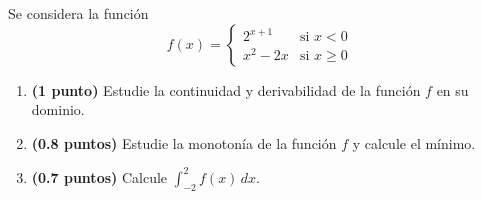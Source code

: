 
Se considera la función
\[
f(x)=\begin{cases}
2^{x+1} & \text{si }x<0\\
x^2-2x & \text{si }x\geq 0
\end{cases}
\]
\begin{enumerate}[label=\alph*)]
  \item \textbf{(1 punto)} Estudie la continuidad y derivabilidad de la
  función $f$ en su dominio.
  \item \textbf{(0.8 puntos)} Estudie la monotonía de la función $f$ y
  calcule el mínimo.
  \item \textbf{(0.7 puntos)} Calcule $\displaystyle\int_{-2}^{2}f(x)\,dx$.
\end{enumerate}
